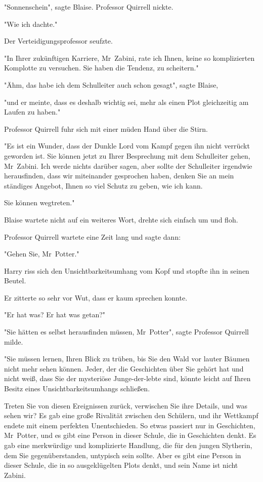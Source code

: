 {"Sonnenschein", sagte Blaise. Professor Quirrell nickte.

"Wie ich dachte."

Der Verteidigungsprofessor seufzte.

"In Ihrer zukünftigen Karriere, Mr~Zabini, rate ich Ihnen, keine so komplizierten Komplotte zu versuchen. Sie haben die Tendenz, zu scheitern."

"Ähm, das habe ich dem Schulleiter auch schon gesagt", sagte Blaise,

"und er meinte, dass es deshalb wichtig sei, mehr als einen Plot gleichzeitig am Laufen zu haben."

Professor Quirrell fuhr sich mit einer müden Hand über die Stirn.

"Es ist ein Wunder, dass der Dunkle Lord vom Kampf gegen ihn nicht verrückt geworden ist. Sie können jetzt zu Ihrer Besprechung mit dem Schulleiter gehen, Mr~Zabini. Ich werde nichts darüber sagen, aber sollte der Schulleiter irgendwie herausfinden, dass wir miteinander gesprochen haben, denken Sie an mein ständiges Angebot, Ihnen so viel Schutz zu geben, wie ich kann.

Sie können wegtreten."

Blaise wartete nicht auf ein weiteres Wort, drehte sich einfach um und floh.

Professor Quirrell wartete eine Zeit lang und sagte dann:

"Gehen Sie, Mr~Potter."

Harry riss sich den Unsichtbarkeitsumhang vom Kopf und stopfte ihn in seinen Beutel.

Er zitterte so sehr vor Wut, dass er kaum sprechen konnte.

"Er hat was? Er hat was getan?"

"Sie hätten es selbst herausfinden müssen, Mr~Potter", sagte Professor Quirrell milde.

"Sie müssen lernen, Ihren Blick zu trüben, bis Sie den Wald vor lauter Bäumen nicht mehr sehen können. Jeder, der die Geschichten über Sie gehört hat und nicht weiß, dass Sie der mysteriöse Junge-der-lebte sind, könnte leicht auf Ihren Besitz eines Unsichtbarkeitsumhangs schließen.

Treten Sie von diesen Ereignissen zurück, verwischen Sie ihre Details, und was sehen wir? Es gab eine große Rivalität zwischen den Schülern, und ihr Wettkampf endete mit einem perfekten Unentschieden. So etwas passiert nur in Geschichten, Mr~Potter, und es gibt eine Person in dieser Schule, die in Geschichten denkt. Es gab eine merkwürdige und komplizierte Handlung, die für den jungen Slytherin, dem Sie gegenüberstanden, untypisch sein sollte. Aber es gibt eine Person in dieser Schule, die in so ausgeklügelten Plots denkt, und sein Name ist nicht Zabini.

}
